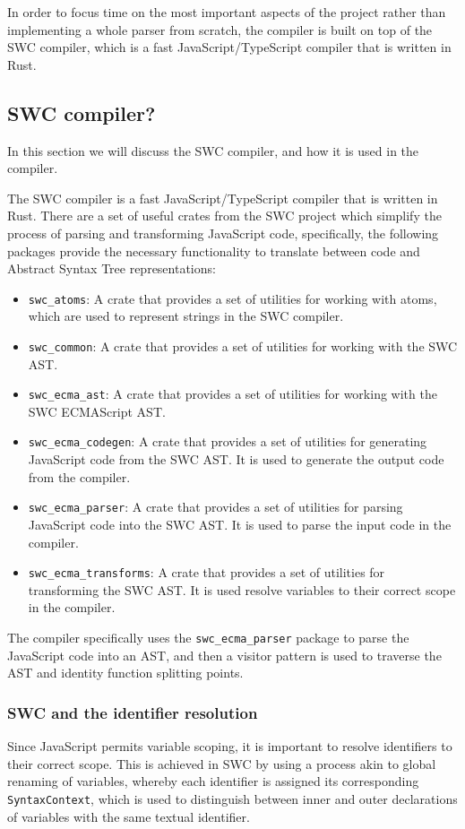In order to focus time on the most important aspects of the project rather than implementing a whole parser from scratch, the \faaasc{} compiler is built on top of the SWC compiler, which is a fast JavaScript/TypeScript compiler that is written in Rust.

\subsection{SWC compiler?}
In this section we will discuss the SWC compiler, and how it is used in the \faaasc{} compiler.

The SWC compiler is a fast JavaScript/TypeScript compiler that is written in Rust. There are a set of useful crates from the SWC project which simplify the process of parsing and transforming JavaScript code, specifically, the following packages provide the necessary functionality to translate between code and Abstract Syntax Tree representations:

\begin{itemize}
    \item \verb|swc_atoms|: A crate that provides a set of utilities for working with atoms, which are used to represent strings in the SWC compiler.
    \item \verb|swc_common|: A crate that provides a set of utilities for working with the SWC AST.
    \item \verb|swc_ecma_ast|: A crate that provides a set of utilities for working with the SWC ECMAScript AST.
    \item \verb|swc_ecma_codegen|: A crate that provides a set of utilities for generating JavaScript code from the SWC AST. It is used to generate the output code from the \faaasc{} compiler.
    \item \verb|swc_ecma_parser|: A crate that provides a set of utilities for parsing JavaScript code into the SWC AST. It is used to parse the input code in the \faaasc{} compiler.
    \item \verb|swc_ecma_transforms|: A crate that provides a set of utilities for transforming the SWC AST. It is used resolve variables to their correct scope in the \faaasc{} compiler.
\end{itemize}

The \faaasc{} compiler specifically uses the \verb|swc_ecma_parser| package to parse the JavaScript code into an AST, and then a visitor pattern is used to traverse the AST and identity function splitting points.

\subsubsection{SWC and the identifier resolution}
Since JavaScript permits variable scoping, it is important to resolve identifiers to their correct scope. This is achieved in SWC by using a process akin to global renaming of variables, whereby each identifier is assigned its corresponding \verb|SyntaxContext|, which is used to distinguish between inner and outer declarations of variables with the same textual identifier.

